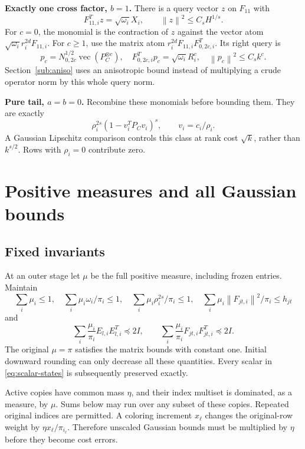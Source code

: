 \documentclass[11pt]{article}
\theoremstyle{remark}\newtheorem{remark}[theorem]{Remark}
\newcommand{\norm}[1]{\left\|#1\right\|}\newcommand{\ip}[2]{\left\langle #1,#2\right\rangle}
\begin{document}
\textbf{Exactly one cross factor, $b=1$.} There is a query vector $z$ on $F_{11}$ with
\[
 F_{11,i}^Tz=\sqrt{\omega_i}X_i,\qquad \norm z^2\le C_sH^{1/s}.
\]
For $c=0$, the monomial is the contraction of $z$ against the vector atom $\sqrt{\omega_i}r_i^{2d}F_{11,i}$. For $c\ge1$, use the matrix atom $r_i^{2d}F_{11,i}F_{0,2c,i}^T$. Its right query is
\begin{equation}\label{eq:pquery}
 p_c=N_{0,2c}^{1/2}\operatorname{vec}(P_C^{\otimes c}),\quad
 F_{0,2c,i}^Tp_c=\sqrt{\omega_i}R_i^c,\quad \norm{p_c}^2\le C_s k^c.
\end{equation}
Section~\ref{sub:aniso} uses an anisotropic bound instead of multiplying a crude operator norm by this whole query norm.

\textbf{Pure tail, $a=b=0$.} Recombine these monomials before bounding them. They are exactly
\begin{equation}\label{eq:pure-tail}
 \rho_i^{2s}(1-v_i^TP_Cv_i)^s,\qquad v_i=c_i/\rho_i.
\end{equation}
A Gaussian Lipschitz comparison controls this class at rank cost $\sqrt{k}$, rather than $k^{s/2}$. Rows with $\rho_i=0$ contribute zero.

\section{Positive measures and all Gaussian bounds}\label{sec:gaussian-bounds}
\subsection{Fixed invariants}
At an outer stage let $\mu$ be the full positive measure, including frozen entries. Maintain
\begin{equation}\label{eq:scalar-states}
 \sum_i\mu_i\le1,\quad \sum_i\mu_i\omega_i/\pi_i\le1,\quad
 \sum_i\mu_i\rho_i^{2s}/\pi_i\le1,\quad
 \sum_i\mu_i\norm{F_{jt,i}}^2/\pi_i\le h_{jt}
\end{equation}
and
\begin{equation}\label{eq:matrix-states}
 \sum_i\frac{\mu_i}{\pi_i}E_{l,i}E_{l,i}^T\preceq2I,\qquad
 \sum_i\frac{\mu_i}{\pi_i}F_{jt,i}F_{jt,i}^T\preceq2I.
\end{equation}
The original $\mu=\pi$ satisfies the matrix bounds with constant one. Initial downward rounding can only decrease all these quantities. Every scalar in \eqref{eq:scalar-states} is subsequently preserved exactly.

Active copies have common mass $\eta$, and their index multiset is dominated, as a measure, by $\mu$. Sums below may run over any subset of these copies. Repeated original indices are permitted. A coloring increment $x_\ell$ changes the original-row weight by $\eta x_\ell/\pi_{i_\ell}$. Therefore unscaled Gaussian bounds must be multiplied by $\eta$ before they become cost errors.
\end{document}
